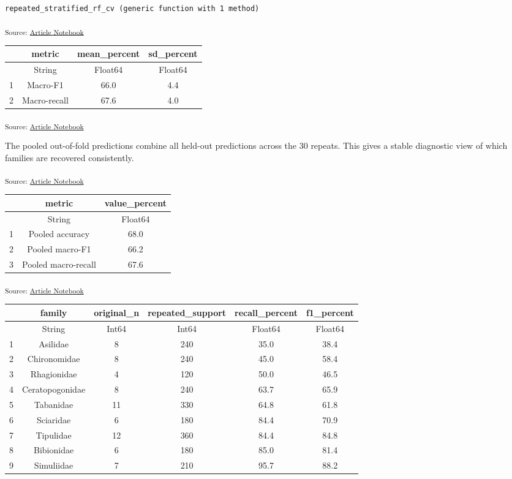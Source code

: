 \documentclass[
  a4paper,
  DIV=11,
  numbers=noendperiod]{scrartcl}
\begin{document}
\begin{verbatim}
repeated_stratified_rf_cv (generic function with 1 method)
\end{verbatim}

\textsubscript{Source:
\href{https://JuliaTDA.github.io/tda-fly/index.qmd.html}{Article
Notebook}}

\begin{tabular}{r|ccc}
    & metric & mean\_percent & sd\_percent\\
    \hline
    & String & Float64 & Float64\\
    \hline
    1 & Macro-F1 & 66.0 & 4.4 \\
    2 & Macro-recall & 67.6 & 4.0 \\
\end{tabular}

\textsubscript{Source:
\href{https://JuliaTDA.github.io/tda-fly/index.qmd.html}{Article
Notebook}}

The pooled out-of-fold predictions combine all held-out predictions
across the 30 repeats. This gives a stable diagnostic view of which
families are recovered consistently.

\textsubscript{Source:
\href{https://JuliaTDA.github.io/tda-fly/index.qmd.html}{Article
Notebook}}

\begin{tabular}{r|cc}
    & metric & value\_percent\\
    \hline
    & String & Float64\\
    \hline
    1 & Pooled accuracy & 68.0 \\
    2 & Pooled macro-F1 & 66.2 \\
    3 & Pooled macro-recall & 67.6 \\
\end{tabular}

\textsubscript{Source:
\href{https://JuliaTDA.github.io/tda-fly/index.qmd.html}{Article
Notebook}}

\begin{tabular}{r|ccccc}
    & family & original\_n & repeated\_support & recall\_percent & f1\_percent\\
    \hline
    & String & Int64 & Int64 & Float64 & Float64\\
    \hline
    1 & Asilidae & 8 & 240 & 35.0 & 38.4 \\
    2 & Chironomidae & 8 & 240 & 45.0 & 58.4 \\
    3 & Rhagionidae & 4 & 120 & 50.0 & 46.5 \\
    4 & Ceratopogonidae & 8 & 240 & 63.7 & 65.9 \\
    5 & Tabanidae & 11 & 330 & 64.8 & 61.8 \\
    6 & Sciaridae & 6 & 180 & 84.4 & 70.9 \\
    7 & Tipulidae & 12 & 360 & 84.4 & 84.8 \\
    8 & Bibionidae & 6 & 180 & 85.0 & 81.4 \\
    9 & Simuliidae & 7 & 210 & 95.7 & 88.2 \\
\end{tabular}
\end{document}
